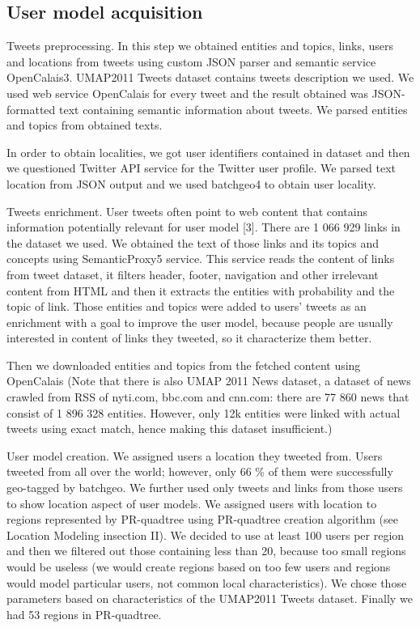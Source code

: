 \documentclass[a4, conference]{IEEEtran}
\begin{document}
\subsection{User model acquisition} 

 Tweets  preprocessing.  In  this  step  we  obtained  entities and  topics,  links,  users  and  locations  from  tweets using custom  JSON  parser  and  semantic  service  OpenCalais3. UMAP2011  Tweets  dataset  contains  tweets  description  we used.  We  used  web  service  OpenCalais  for  every  tweet  and the   result   obtained   was   JSON-formatted   text   containing semantic  information  about  tweets.  We  parsed  entities  and topics from obtained texts. 

 In  order  to  obtain  localities,  we  got  user  identifiers contained  in  dataset  and  then  we  questioned  Twitter  API service  for  the  Twitter  user  profile.  We  parsed  text  location from  JSON  output  and  we  used  batchgeo4 to  obtain  user locality. 

 Tweets  enrichment.   User   tweets   often   point   to   web content that contains information potentially relevant for user model [3]. There are 1 066 929 links in the dataset we used. We  obtained  the  text  of  those  links  and  its  topics and concepts  using  SemanticProxy5 service.  This  service  reads the  content  of  links  from  tweet  dataset,  it  filters  header, footer,  navigation  and  other irrelevant  content  from  HTML and then it extracts the entities with probability and the topic of link. Those entities and topics were added to users’ tweets as  an  enrichment  with  a  goal  to  improve  the  user  model, because people are usually interested in content of links they tweeted, so it characterize them better.

 Then we downloaded entities and topics from the fetched content  using OpenCalais  (Note  that  there  is  also  UMAP 2011  News  dataset,  a  dataset  of  news  crawled  from  RSS  of nyti.com,  bbc.com  and  cnn.com:  there  are  77 860  news  that consist  of  1 896 328  entities.  However,  only  12k  entities were  linked  with  actual  tweets  using  exact  match,  hence making this dataset insufficient.)

 User  model  creation.  We  assigned  users  a  location they tweeted   from.   Users   tweeted   from   all   over   the   world; however,  only  66 \%  of  them  were  successfully  geo-tagged by  batchgeo.  We  further  used  only  tweets  and  links from those  users  to  show  location  aspect  of  user  models.  We assigned  users  with  location  to  regions  represented  by  PR-quadtree using PR-quadtree creation algorithm (see Location Modeling insection II). We decided to use at least 100 users per region and then we filtered out those containing less than 20,  because  too  small  regions  would  be  useless  (we would create  regions  based  on  too  few  users  and  regions  would model  particular  users,  not  common  local  characteristics). We  chose  those  parameters  based  on  characteristics of  the UMAP2011  Tweets dataset.  Finally  we  had  53  regions in PR-quadtree.
\end{document}
